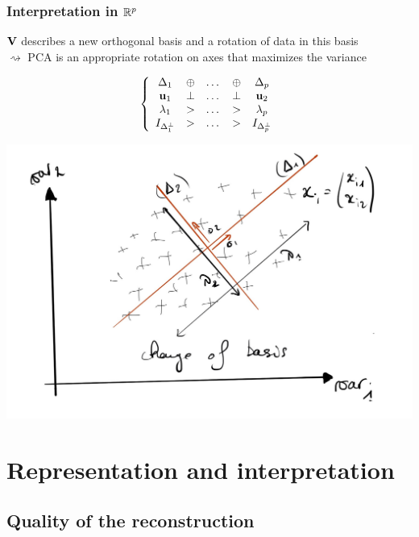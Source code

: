 \documentclass{beamer}\usepackage[]{graphicx}\usepackage[]{color}
\begin{document}
\begin{frame}
  \frametitle{Interpretation in $\mathbb{R}^p$}
    
  $\mathbf{V}$ describes a new orthogonal basis and a rotation of data in this basis\\
  $\rightsquigarrow$ PCA is an appropriate rotation on axes that maximizes the variance

  \begin{equation*}
    \left\{\begin{array}{ccccc}
      \Delta_1 & \oplus & \dots & \oplus & \Delta_p \\
      \mathbf{u}_1 & \bot & \dots & \bot & \mathbf{u}_2 \\
      \lambda_1 & > & \dots & > & \lambda_p \\
      I_{\Delta_1^\bot} & > & \dots & > & I_{\Delta_p^\bot} \\
    \end{array}\right.
  \end{equation*}

  \includegraphics[width=.6\textwidth]{rotation}
\end{frame}


\section{Representation and interpretation}

\subsection{Quality of the reconstruction}
\end{document}

